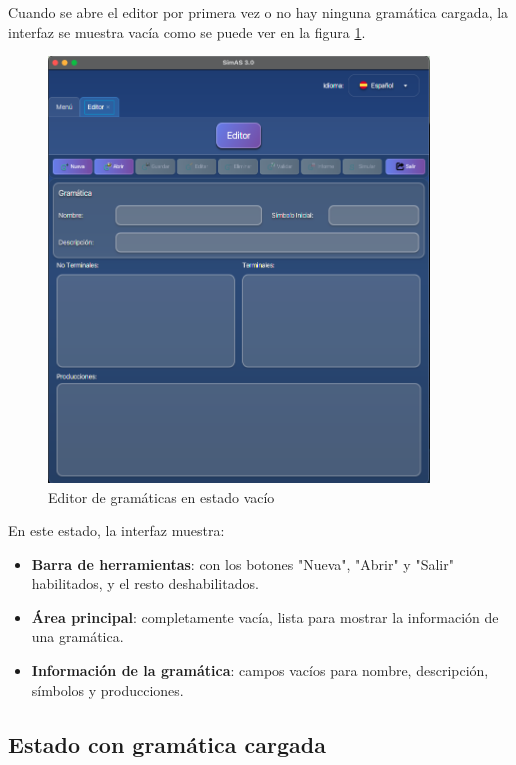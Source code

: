 Cuando se abre el editor por primera vez o no hay ninguna gramática cargada, la interfaz se muestra vacía como se puede ver en la figura \ref{fig:editor_vacio}.

\needspace{8cm}
\begin{figure}[H]
    \centering
    \includegraphics[width=0.9\textwidth]{figuras/editor/editor_vacio.png}
    \caption{Editor de gramáticas en estado vacío}
    \label{fig:editor_vacio}
\end{figure}

En este estado, la interfaz muestra:
\begin{itemize}
    \item \textbf{Barra de herramientas}: con los botones \string"Nueva\string", \string"Abrir\string" y \string"Salir\string" habilitados, y el resto deshabilitados.
    \item \textbf{Área principal}: completamente vacía, lista para mostrar la información de una gramática.
    \item \textbf{Información de la gramática}: campos vacíos para nombre, descripción, símbolos y producciones.
\end{itemize}

\subsection{Estado con gramática cargada}

